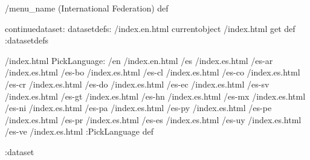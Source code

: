 \begin{ingrid}
/menu_name (International Federation) def

continuedataset:
datasetdefs:
/index.en.html currentobject /index.html get def
:datasetdefs

/index.html {
PickLanguage:
/en /index.en.html
/es /index.es.html
/es-ar /index.es.html
/es-bo /index.es.html
/es-cl /index.es.html
/es-co /index.es.html
/es-cr /index.es.html
/es-do /index.es.html
/es-ec /index.es.html
/es-sv /index.es.html
/es-gt /index.es.html
/es-hn /index.es.html
/es-mx /index.es.html
/es-ni /index.es.html
/es-pa /index.es.html
/es-py /index.es.html
/es-pe /index.es.html
/es-pr /index.es.html
/es-es /index.es.html
/es-uy /index.es.html
/es-ve /index.es.html
:PickLanguage
} def

:dataset

\end{ingrid}
